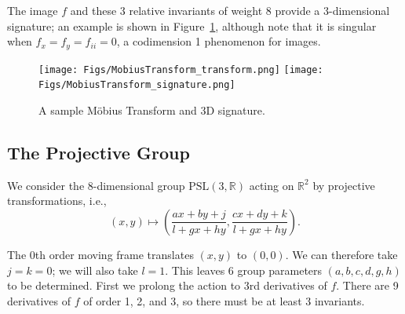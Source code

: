 \documentclass[review,onefignum,onetabnum]{siamonline190516}
\def\R{\mathbb{R}}
\begin{document}
The image $f$ and these 3 relative invariants of weight 8 provide a 3-dimensional signature; an example is shown in Figure~\ref{fig:mobius}, although note that it is singular when $f_x=f_y=f_{ii}=0$, a codimension 1 phenomenon for images. 





\begin{figure}
\centering
\texttt{[image: Figs/MobiusTransform\_transform.png]}
\texttt{[image: Figs/MobiusTransform\_signature.png]}
\caption{A sample M\"obius Transform and 3D signature.}
\label{fig:mobius}
\end{figure}

\subsection{The Projective Group}

We consider the 8-dimensional group $\mathrm{PSL}(3,\R)$ acting on $\R^2$ by projective transformations, i.e., $$(x,y) \mapsto \left(\frac{a x + b y + j}{l + g x + h y}, \frac{c x + d y + k}{l+ g x + h y}\right).$$

The 0th order moving frame translates $(x,y)$ to $(0,0)$. We can therefore take $j=k=0$; we will also take $l=1$. This leaves 6 group parameters $(a,b,c,d,g,h)$ to be determined. First we prolong the action to 3rd derivatives of $f$. There are 9 derivatives of $f$ of order 1, 2, and 3, so there must be at least 3 invariants.
\end{document}

